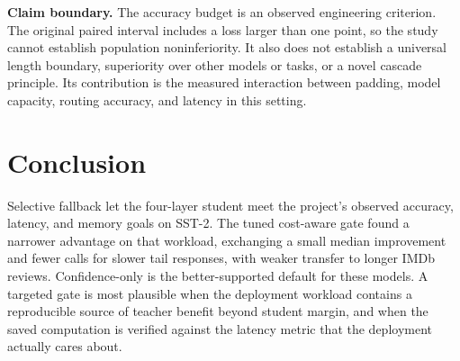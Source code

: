 \textbf{Claim boundary.} The accuracy budget is an observed engineering criterion. The original paired interval includes a loss larger than one point, so the study cannot establish population noninferiority. It also does not establish a universal length boundary, superiority over other models or tasks, or a novel cascade principle. Its contribution is the measured interaction between padding, model capacity, routing accuracy, and latency in this setting.

\section{Conclusion}
Selective fallback let the four-layer student meet the project's observed accuracy, latency, and memory goals on SST-2. The tuned cost-aware gate found a narrower advantage on that workload, exchanging a small median improvement and fewer calls for slower tail responses, with weaker transfer to longer IMDb reviews. Confidence-only is the better-supported default for these models. A targeted gate is most plausible when the deployment workload contains a reproducible source of teacher benefit beyond student margin, and when the saved computation is verified against the latency metric that the deployment actually cares about.
